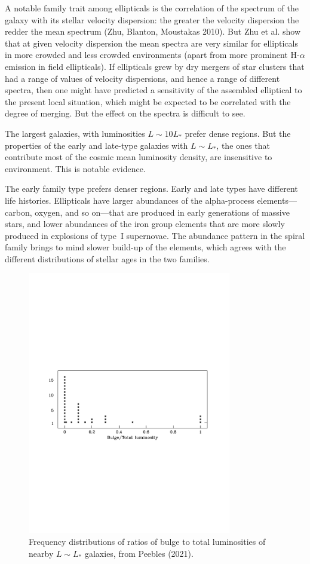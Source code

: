 \documentclass[fleqn,12pt]{article}
\begin{document}
A notable family trait among ellipticals is the correlation of the spectrum of the galaxy with its stellar velocity dispersion: the greater the velocity dispersion the redder the mean spectrum (Zhu, Blanton, Moustakas 2010). But Zhu et al. show that at given velocity dispersion the mean spectra are very similar for ellipticals in more crowded and less crowded environments (apart from more  prominent H-$\alpha$ emission in field ellipticals). If ellipticals grew by dry mergers of star clusters that had a range of values of velocity dispersions, and hence a range of different spectra, then one might have predicted a sensitivity of the assembled elliptical to the present local situation, which might be expected to be correlated with the degree of merging. But the effect on the spectra is difficult to see.

The largest galaxies, with luminosities $L\sim 10L_\ast$ prefer dense regions. But the properties of the early and late-type galaxies with $L\sim L_\ast$, the ones that contribute most of the cosmic mean luminosity density, are insensitive to environment. This is notable evidence.

The early family type prefers denser regions. Early and late types have different life histories. Ellipticals have larger abundances of the alpha-process elements---carbon, oxygen, and so on---that are produced in early generations of massive stars, and lower abundances of the iron group elements that are more slowly produced in explosions of type~I supernovae. The abundance pattern in the spiral family brings to mind slower build-up of the elements, which agrees with the different distributions of stellar ages in the two families. 

\begin{figure}
\begin{center}
\includegraphics[angle=0,width=3.5in]{BtoT.pdf}
\caption{\small Frequency distributions of ratios of bulge to total luminosities of nearby $L\sim L_\ast$ galaxies, from Peebles (2021).}\label{fig:BtoT}
\end{center}
\end{figure}
\end{document}
